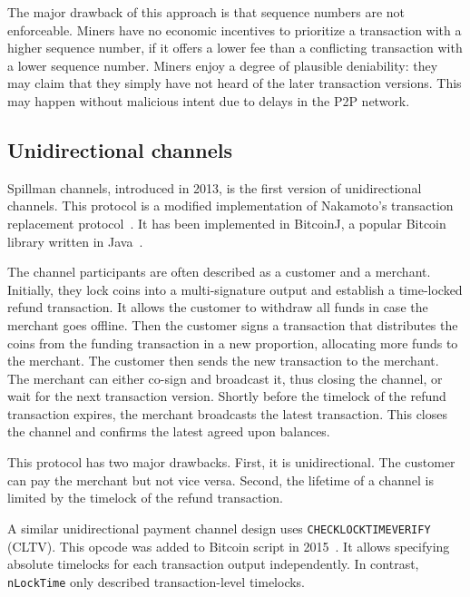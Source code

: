 The major drawback of this approach is that sequence numbers are not enforceable.
Miners have no economic incentives to prioritize a transaction with a higher sequence number, if it offers a lower fee than a conflicting transaction with a lower sequence number.
Miners enjoy a degree of plausible deniability: they may claim that they simply have not heard of the later transaction versions.
This may happen without malicious intent due to delays in the P2P network.


\subsection{Unidirectional channels}

Spillman channels, introduced in 2013, is the first version of unidirectional channels.
This protocol is a modified implementation of Nakamoto's transaction replacement protocol~\cite{Spillman2013}.
It has been implemented in BitcoinJ, a popular Bitcoin library written in Java~\cite{BitcoinJ}.

The channel participants are often described as a customer and a merchant.
Initially, they lock coins into a multi-signature output and establish a time-locked refund transaction.
It allows the customer to withdraw all funds in case the merchant goes offline.
Then the customer signs a transaction that distributes the coins from the funding transaction in a new proportion, allocating more funds to the merchant.
The customer then sends the new transaction to the merchant. 
The merchant can either co-sign and broadcast it, thus closing the channel, or wait for the next transaction version.
Shortly before the timelock of the refund transaction expires, the merchant broadcasts the latest transaction.
This closes the channel and confirms the latest agreed upon balances.

This protocol has two major drawbacks.
First, it is unidirectional.
The customer can pay the merchant but not vice versa.
Second, the lifetime of a channel is limited by the timelock of the refund transaction.

A similar unidirectional payment channel design uses \texttt{CHECKLOCKTIMEVERIFY} (CLTV).
This opcode was added to Bitcoin script in 2015~\cite{Todd2014}.
It allows specifying absolute timelocks for each transaction output independently.
In contrast, \texttt{nLockTime} only described transaction-level timelocks.

